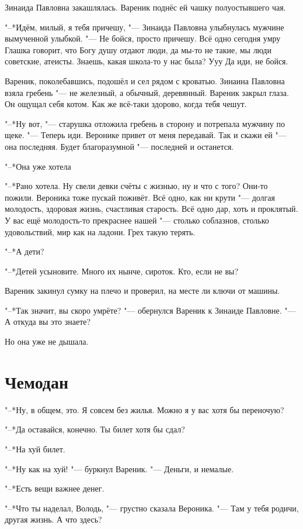 Зинаида Павловна закашлялась.
Вареник поднёс ей чашку полуостывшего чая.

"--*Идём, милый, я тебя причешу, "--- Зинаида Павловна улыбнулась мужчине вымученной улыбкой.
"--- Не бойся, просто причешу.
Всё одно сегодня умру\ldotst
Глашка говорит, что Богу душу отдают люди, да мы-то не такие, мы люди советские, атеисты.
Знаешь, какая школа-то у нас была?
Ууу\ldotst
Да иди, не бойся.

Вареник, поколебавшись, подошёл и сел рядом с кроватью.
Зинаина Павловна взяла гребень "--- не железный, а обычный, деревянный.
Вареник закрыл глаза.
Он ощущал себя котом.
Как же всё-таки здорово, когда тебя чешут.

"--*Ну вот, "--- старушка отложила гребень в сторону и потрепала мужчину по щеке.
"--- Теперь иди.
Веронике привет от меня передавай.
Так и скажи ей "--- она последняя.
Будет благоразумной "--- последней и останется.

"--*Она уже хотела\ldotst

"--*Рано хотела.
Ну свели девки счёты с жизнью, ну и что с того?
Они-то пожили.
Вероника тоже пускай поживёт.
Всё одно, как ни крути "--- долгая молодость, здоровая жизнь, счастливая старость.
Всё одно дар, хоть и проклятый.
У вас ещё молодость-то прекраснее нашей "--- столько соблазнов, столько удовольствий, мир как на ладони.
Грех такую терять.

"--*А дети?

"--*Детей усыновите.
Много их нынче, сироток.
Кто, если не вы?

Вареник закинул сумку на плечо и проверил, на месте ли ключи от машины.

"--*Так значит, вы скоро умрёте? "--- обернулся Вареник к Зинаиде Павловне. 
"--- А откуда вы это знаете?

Но она уже не дышала.

\section{Чемодан}

"--*Ну, в общем, это.
Я совсем без жилья.
Можно я у вас хотя бы переночую?

"--*Да оставайся, конечно.
Ты билет хотя бы сдал?

"--*На хуй билет.

"--*Ну как на хуй! "--- буркнул Вареник.
"--- Деньги, и немалые.

"--*Есть вещи важнее денег.

"--*Что ты наделал, Володь, "--- грустно сказала Вероника.
"--- Там у тебя родичи, другая жизнь.
А что здесь?


